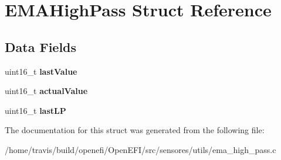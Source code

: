 \hypertarget{structEMAHighPass}{}\section{E\+M\+A\+High\+Pass Struct Reference}
\label{structEMAHighPass}
\subsection*{Data Fields}
\begin{DoxyCompactItemize}
\item 
\mbox{\label{structEMAHighPass_a53df4bb1628740263789e44d94d75b26}} 
uint16\+\_\+t {\bfseries last\+Value}
\item 
\mbox{\label{structEMAHighPass_a405250df44c61a455d676a0f13bfe32b}} 
uint16\+\_\+t {\bfseries actual\+Value}
\item 
\mbox{\label{structEMAHighPass_a38075a21f728f8d39f150825dbc45ef5}} 
uint16\+\_\+t {\bfseries last\+LP}
\end{DoxyCompactItemize}


The documentation for this struct was generated from the following file\+:\begin{DoxyCompactItemize}
\item 
/home/travis/build/openefi/\+Open\+E\+F\+I/src/sensores/utils/ema\+\_\+high\+\_\+pass.\+c\end{DoxyCompactItemize}
